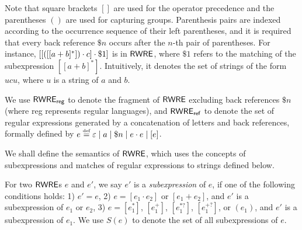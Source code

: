 Note that square brackets $[]$ are used for the operator precedence and the parentheses $()$ are used for capturing groups. 
%
Parenthesis pairs are indexed according to the occurrence sequence of their left parentheses, and it is required that every back reference $\$ n$ occurs  %
after the $n$-th pair of parentheses. For instance, $[[([[a+b]^*]) \cdot c] \cdot \$1]$ is in ${\sf RWRE}$, where $\$1$ refers to the matching of the subexpression $[[a+b]^*]$. Intuitively, it denotes the set of strings of the form $u c u$, where $u$ is a string of $a$ and $b$. 
  
We use ${\sf RWRE_{reg}}$ to denote the fragment of ${\sf RWRE}$ excluding  back references $\$ n$ (where {\sf reg} represents regular languages), and ${\sf RWRE_{ref}}$ to denote the set of regular expressions generated by a concatenation of letters and back references, formally %
defined by $e \eqdef \varepsilon \mid a \mid \$n \mid e \concat e \mid [e]$.  
  
  

We shall define the semantics of ${\sf RWRE}$, which uses the concepts of subexpressions and matches of regular expressions to strings defined below.
  
   For two ${\sf RWRE}$s $e$ and $e'$, we say $e'$ is a \emph{subexpression} of $e$,
  	if one of the following conditions holds: 1) $e'=e$, 2) $e = [e_1 \cdot e_2]$ or $[e_1 + e_2]$, and $e'$ is a subexpression of $e_1$ or $e_2$, 3) $e = [e_1^{\ast}]$, $[e_1^{+}]$, $[e_1^{\ast?}]$, $[e_1^{+?}]$, or $(e_1)$, and $e'$ is a subexpression of $e_1$. We use $S (e)$ to denote the set of all subexpressions of $e$. %
  
